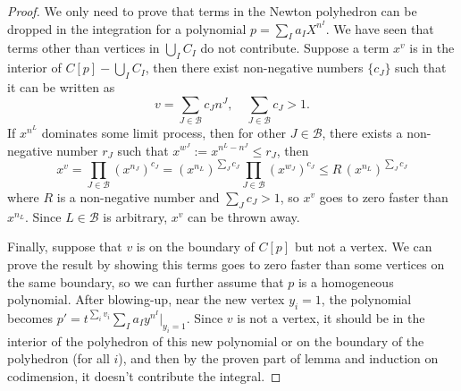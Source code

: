 \documentclass[12pt]{article}
\theoremstyle{definition}
\theoremstyle{plain}
\begin{document}
\begin{proof}
We only need to prove that terms in the Newton polyhedron can be dropped in the 
integration for a polynomial $p=\sum_I a_I X^{n^I}$.
We have seen that terms other than vertices in $\bigcup_I C_I$ do not contribute. Suppose a term $x^v$ 
is in the interior of $C[p]-\bigcup_I C_I$,  
then there exist non-negative numbers $\{c_J\}$ such that it can be written as 
\[
	v = \sum_{J\in \mathscr B}c_J n^J,\quad \sum_{J\in \mathscr B} c_J>1.
\]
If $x^{n^L}$ dominates some limit process, 
then for other $J\in \mathscr B$, there exists a non-negative number $r_J$ such that
$x^{w^J}:=x^{n^L-n^J}\leq r_J$, then 
\[
	x^v = \prod_{J\in\mathscr B} (x^{n_J})^{c_J} = 
	(x^{n_L})^{\sum_J c_J}\prod_{J\in \mathscr B} 
	(x^{w_J})^{c_J}\leq R\,(x^{n_L})^{\sum_J c_J}
\] 
where $R$ is a non-negative number and $\sum_J c_J>1$, so $x^v$ goes to 
zero faster than $x^{n_L}$. Since $L\in \mathscr B$ is arbitrary, $x^v$ can be thrown away.

Finally, suppose that $v$ is on the boundary of $C[p]$ but not a vertex.
We can prove the result by showing this terms goes to zero faster than some vertices on the 
same boundary, so we can further assume that $p$ is a homogeneous polynomial.
After blowing-up, near the new vertex
$y_i=1$, the polynomial becomes $p'=t^{\sum_i v_i}\sum_{I}a_I y^{n^I}|_{y_i=1}$. 
Since $v$ is not a vertex, it should be in the interior of the polyhedron of this new polynomial or 
on the boundary of the polyhedron (for all $i$), and then by 
the proven part of lemma and induction on codimension, it doesn't contribute the integral.
\end{proof}
\end{document}
